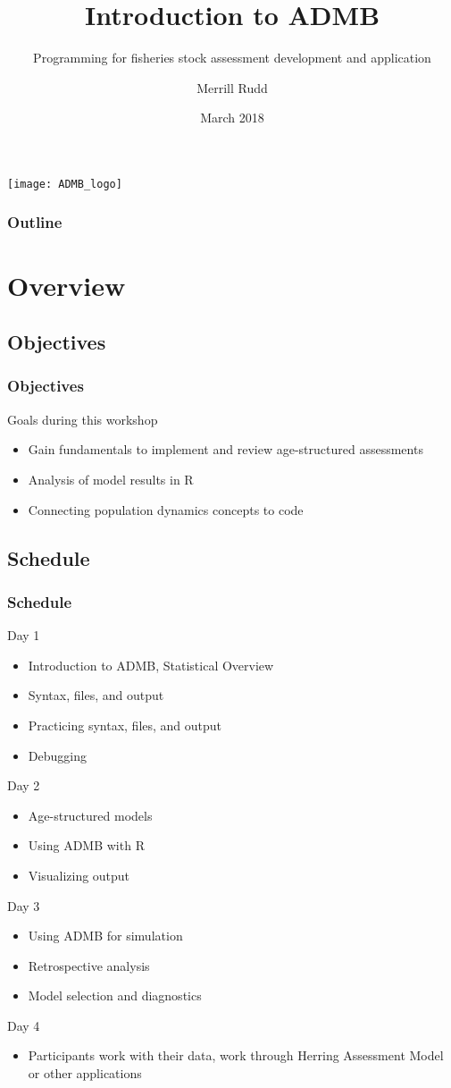 \documentclass{beamer}
\title{Introduction to ADMB}
\subtitle{Programming for fisheries stock assessment development and application}
\author{Merrill Rudd}
\date{March 2018}
\begin{document}
\begin{frame}
  \titlepage
  \texttt{[image: ADMB\_logo]}
\end{frame}

\begin{frame}
\frametitle{Outline}
 \tableofcontents
\end{frame}

\section{Overview}
\subsection{Objectives}

\begin{frame}
\frametitle{Objectives}
Goals during this workshop
\begin{itemize}
	\item Gain fundamentals to implement and review age-structured assessments
	\item Analysis of model results in R
	\item Connecting population dynamics concepts to code
\end{itemize}
\end{frame}

\subsection{Schedule}
\begin{frame}
  \frametitle{Schedule}
  Day 1
  \begin{itemize}
  \item Introduction to ADMB, Statistical Overview
  \item Syntax, files, and output
  \item Practicing syntax, files, and output
  \item Debugging
  \end{itemize}
  Day 2
  \begin{itemize}
   \item Age-structured models
  \item Using ADMB with R
  \item Visualizing output
  \end{itemize}
  Day 3
  \begin{itemize}
  \item Using ADMB for simulation
  \item Retrospective analysis
  \item Model selection and diagnostics
  \end{itemize}
  Day 4
  \begin{itemize}
  \item Participants work with their data, work through Herring Assessment Model or other applications
    \end{itemize}
 \end{frame}
\end{document}
